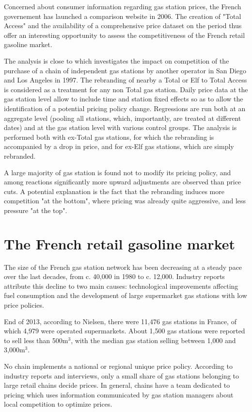 \documentclass[11pt]{article}
\begin{document}
Concerned about consumer information regarding gas station prices, the French governement has launched a comparison website in 2006. The creation of "Total Access" and the availability of a comprehensive price dataset on the period thus offer an interesting opportunity to assess the competitiveness of the French retail gasoline market.

The analysis is close to \cite{HAS04} which investigates the impact on competition of the purchase of a chain of independent gas stations by another operator in San Diego and Los Angeles in 1997. The rebranding of nearby a Total or Elf to Total Access is considered as a treatment for any non Total gas station. Daily price data at the gas station level allow to include time and station fixed effects so as to allow the identification of a potential pricing policy change. Regressions are run both at an aggregate level (pooling all stations, which, importantly, are treated at different dates) and at the gas station level with various control groups. The analysis is performed both with ex-Total gas stations, for which the rebranding is accompanied by a drop in price, and for ex-Elf gas stations, which are simply rebranded.

A large majority of gas station is found not to modify its pricing policy, and among reactions significantly more upward adjustments are observed than price cuts. A potential explanation is the fact that the rebranding induces more competition "at the bottom", where pricing was already quite aggressive, and less pressure "at the top".

\section{The French retail gasoline market}

The size of the French gas station network has been decreasing at a steady pace over the last decades, from c. 40,000 in 1980 to c. 12,000. Industry reports attribute this decline to two main causes: technological improvements affecting fuel consumption and the development of large supermarket gas stations with low price policies.

End of 2013, according to Nielsen, there were 11,476 gas stations in France, of which 4,979 were operated supermarkets. About 1,500 gas stations were reported to sell less than 500m$^{3}$, with the median gas station selling between 1,000 and 3,000m$^{3}$.

No chain implements a national or regional unique price policy. According to industry reports and interviews, only a small share of gas stations belonging to large retail chains decide prices. In general, chains have a team dedicated to pricing which uses information communicated by gas station managers about local competition to optimize prices.
\end{document}
